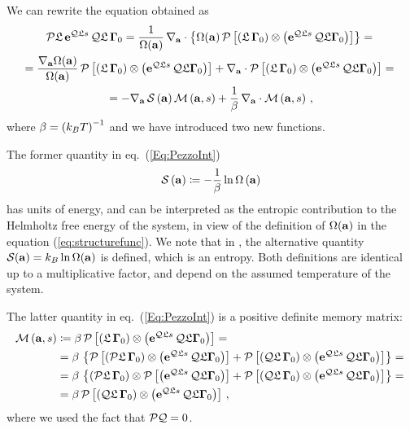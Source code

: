 \documentclass[10pt,a4paper]{book}
\theoremstyle{definition}
\begin{document}
We can rewrite the equation obtained as
\begin{multline}\label{Eq:PezzoInt}
\mathcal{P}\mathfrak{L}\,\mathbf{e}^{\mathcal{Q}\mathfrak{L} s}\,\mathcal{Q}\mathfrak{L}\,\boldsymbol\Gamma_{0} = \frac{1}{\Omega(\mathbf{a})}\, \nabla_{\mathbf{a}}\cdot\left\lbrace  \Omega(\mathbf{a})\,
    \mathcal{P}\left[ \left( \mathfrak{L}\,\boldsymbol\Gamma_{0}\right) \otimes \left( \mathbf{e}^{\mathcal{Q}\mathfrak{L} s}\,\mathcal{Q}\mathfrak{L}\boldsymbol\Gamma_{0} \right) \right] \right\rbrace ={}\\
  = \frac{\nabla_{\mathbf{a}}\Omega(\mathbf{a})}{\Omega(\mathbf{a})}\, \mathcal{P}\left[ \left( \mathfrak{L}\,\boldsymbol\Gamma_{0}\right) 
    \otimes \left( \mathbf{e}^{\mathcal{Q}\mathfrak{L} s}\,\mathcal{Q}\mathfrak{L}\boldsymbol\Gamma_{0} \right) \right] +
    \nabla_{\mathbf{a}}\cdot\mathcal{P}\left[ \left( \mathfrak{L}\,\boldsymbol\Gamma_{0}\right) \otimes \left( \mathbf{e}^{\mathcal{Q}\mathfrak{L} s}\,\mathcal{Q}\mathfrak{L}\boldsymbol\Gamma_{0} \right) \right] ={}\\
  = - \nabla_{\mathbf{a}}\,\mathcal{S}\left(\mathbf{a}\right)\mathcal{M}\left(\mathbf{a},s\right) + \frac{1}{\beta}\, \nabla_{\mathbf{a}}\cdot\mathcal{M}\left(\mathbf{a},s\right)\,,
\end{multline}
where $\beta=\left(k_B T\right)^{-1}$ and we have introduced two new functions.

\noindent
The former quantity in eq.~(\ref{Eq:PezzoInt})
\begin{equation}\label{Eq:Entropy(FreeE)}
  \mathcal{S}\left(\mathbf{a}\right)\coloneqq -\frac{1}{\beta}\ln \Omega\left(\mathbf{a}\right)
\end{equation}
has units of energy, and can be interpreted as the entropic contribution to the Helmholtz free energy of the system, in view of the definition of $\Omega(\mathbf{a})$ in the equation (\ref{eq:structurefunc}). We note that in \cite{Hijon2010}, the alternative quantity $\mathcal{S}(\mathbf{a}) = k_B\ln{\Omega(\mathbf{a})}$ is defined, which is an entropy. Both definitions are identical up to a multiplicative factor, and depend on the assumed temperature of the system.

\noindent
The latter quantity in eq.~(\ref{Eq:PezzoInt}) is a positive definite memory matrix:
\begin{equation}
\begin{split}\label{Eq:fricmatrix}
	\mathcal{M}\left(\mathbf{a},s\right) &\coloneqq \beta\,\mathcal{P}\left[ \left( \mathfrak{L}\,\boldsymbol\Gamma_{0}\right) \otimes 
	  \left( \mathbf{e}^{\mathcal{Q}\mathfrak{L} s}\,\mathcal{Q}\mathfrak{L}\boldsymbol\Gamma_{0} \right) \right] ={}\\
	&= \beta\,\left\lbrace  \mathcal{P}\left[ \left( \mathcal{P}\mathfrak{L}\,\boldsymbol\Gamma_{0}\right) \otimes \left( \mathbf{e}^{\mathcal{Q}\mathfrak{L} s}\,\mathcal{Q}\mathfrak{L}\boldsymbol\Gamma_{0} \right) \right] + 
	  \mathcal{P}\left[ \left( \mathcal{Q}\mathfrak{L}\,\boldsymbol\Gamma_{0}\right) \otimes \left( \mathbf{e}^{\mathcal{Q}\mathfrak{L} s}\,\mathcal{Q}\mathfrak{L}\boldsymbol\Gamma_{0} \right) \right] \right\rbrace ={}\\
	&= \beta\,\left\lbrace  \left( \mathcal{P}\mathfrak{L}\,\boldsymbol\Gamma_{0}\right) \otimes \mathcal{P}\left[\left( \mathbf{e}^{\mathcal{Q}\mathfrak{L} s}\,\mathcal{Q}\mathfrak{L}\boldsymbol\Gamma_{0} \right) \right] + 
	  \mathcal{P}\left[ \left( \mathcal{Q}\mathfrak{L}\,\boldsymbol\Gamma_{0}\right) \otimes \left( \mathbf{e}^{\mathcal{Q}\mathfrak{L} s}\,\mathcal{Q}\mathfrak{L}\boldsymbol\Gamma_{0} \right) \right] \right\rbrace ={}\\
	&= \beta\,\mathcal{P}\left[ \left( \mathcal{Q}\mathfrak{L}\,\boldsymbol\Gamma_{0}\right) \otimes \left( \mathbf{e}^{\mathcal{Q}\mathfrak{L} s}\,\mathcal{Q}\mathfrak{L}\boldsymbol\Gamma_{0} \right) \right]\,, 
\end{split}
\end{equation}
where we used the fact that $\mathcal{P}\mathcal{Q}=0$.
\end{document}

